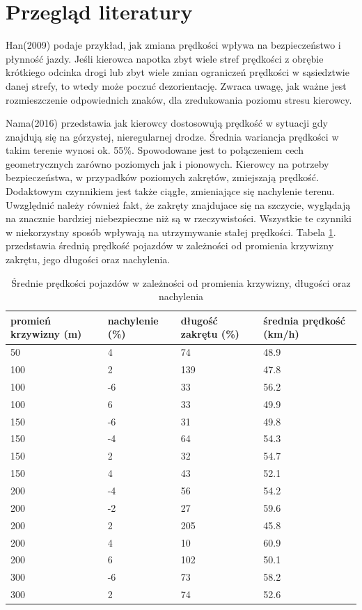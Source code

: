 \section{Przegląd literatury}
\label{sec:przegladLiteratury}	

Han(2009) podaje przykład, jak zmiana prędkości wpływa na bezpieczeństwo i płynność jazdy. Jeśli kierowca napotka zbyt wiele stref prędkości z obrębie krótkiego odcinka drogi lub zbyt wiele zmian ograniczeń prędkości w sąsiedztwie danej strefy, to wtedy może poczuć dezorientację. Zwraca uwagę, jak ważne jest rozmieszczenie odpowiednich znaków, dla zredukowania poziomu stresu kierowcy.

Nama(2016) przedstawia jak kierowcy dostosowują prędkość w sytuacji gdy znajdują się na górzystej, nieregularnej drodze. Średnia wariancja prędkości w takim terenie wynosi ok. 55\%. Spowodowane jest to połączeniem cech geometrycznych zarówno poziomych jak i pionowych. Kierowcy na potrzeby bezpieczeństwa, w przypadków poziomych zakrętów, zmiejszają prędkość. Dodaktowym czynnikiem jest także ciągłe, zmieniające się nachylenie terenu. Uwzględnić należy również fakt, że zakręty znajdujace się na szczycie, wyglądają na znacznie bardziej niebezpieczne niż są w rzeczywistości. Wszystkie te czynniki w niekorzystny sposób wpływają na utrzymywanie stałej prędkości. Tabela \ref{predkosciPromienKrzywizny}. przedstawia średnią prędkość pojazdów w zależności od promienia krzywizny zakrętu, jego długości oraz nachylenia.

 
\begin{table}[ht]
\centering
\caption{Średnie prędkości pojazdów w zależności od promienia krzywizny, długości oraz nachylenia}
\label{predkosciPromienKrzywizny}
\begin{tabular}{| l | l | l | l | }
\hline
\textbf{promień krzywizny (m)} & \textbf{nachylenie (\%)} & \textbf{długość zakrętu (\%)} & \textbf{średnia prędkość (km/h)} \\ \hline
50 & 4 & 74 & 48.9\\ \hline
100 & 2 & 139 & 47.8\\ \hline
100 & -6 & 33 & 56.2\\ \hline
100 & 6 & 33 & 49.9\\ \hline
150 & -6 & 31 & 49.8\\ \hline
150 & -4 & 64 & 54.3\\ \hline
150 & 2 & 32 & 54.7\\ \hline
150 & 4 & 43 & 52.1\\ \hline
200 & -4 & 56 & 54.2\\ \hline
200 & -2 & 27 & 59.6\\ \hline
200 & 2 & 205 & 45.8\\ \hline
200 & 4 & 10 & 60.9\\ \hline
200 & 6 & 102 & 50.1\\ \hline
300 & -6 & 73 & 58.2\\ \hline
300 & 2 & 74 & 52.6\\ \hline

\end{tabular}
\end{table}

